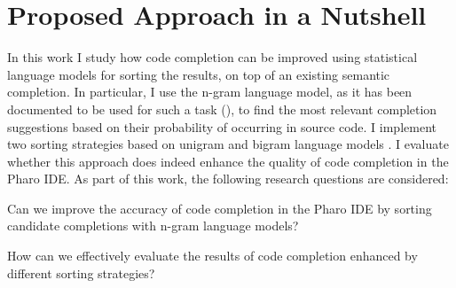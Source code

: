 \section{Proposed Approach in a Nutshell}
\label{sec:Introduction-Approach}
In this work I study how code completion can be improved using statistical language models for sorting the results, on top of an existing semantic completion. In particular, I use the n-gram language model, as it has been documented to be used for such a task (\cite{Hind12a}), to find the most relevant completion suggestions based on their probability of occurring in source code. I  implement two sorting strategies based on  unigram and bigram language models  . I  evaluate whether this approach does indeed enhance the quality of code completion in the Pharo IDE.  As part of this work, the following research questions are considered:
\begin{RQ}
    \item Can we improve the accuracy of code completion in the Pharo IDE by sorting candidate completions with n-gram language models?
    \item How can we effectively evaluate the results of code completion enhanced by different sorting strategies?
\end{RQ}

